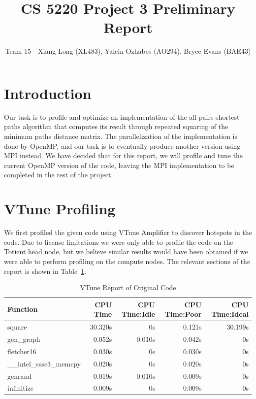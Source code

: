 \documentclass{article}
\begin{document}
\title{CS 5220 Project 3 Preliminary Report}
\author{Team 15 - Xiang Long (XL483), Yalcin Ozhabes (AO294), Bryce Evans (BAE43)}

\maketitle

\section{Introduction}

Our task is to profile and optimize an implementation of the all-pairs-shortest-paths algorithm that computes its result through repeated squaring of the minimum paths distance matrix. The parallelization of the implementation is done by OpenMP, and our task is to eventually produce another version using MPI instead. We have decided that for this report, we will profile and tune the current OpenMP version of the code, leaving the MPI implementation to be completed in the rest of the project.

\section{VTune Profiling}

We first profiled the given code using VTune Amplifier to discover hotspots in the code. Due to license limitations we were only able to profile the code on the Totient head node, but we believe similar results would have been obtained if we were able to perform profiling on the compute nodes. The relevant sections of the report is shown in Table~\ref{vtune}.

\begin{table}[h]
 \centering
  \begin{tabular}{ | l | r | r | r | r | }
 \hline
Function             & CPU Time &  CPU Time:Idle & CPU Time:Poor & CPU Time:Ideal \\ \hline
square               &  30.320s &             0s &        0.121s &        30.199s \\
gen\_graph            &   0.052s &         0.010s &        0.042s &             0s \\
fletcher16           &   0.030s &             0s &        0.030s &             0s \\
\_\_intel\_ssse3\_memcpy &   0.020s &             0s &        0.020s &             0s \\
genrand              &   0.019s &         0.010s &        0.009s &             0s \\
infinitize           &   0.009s &             0s &        0.009s &             0s \\ \hline
\end{tabular}
 \caption{VTune Report of Original Code}
 \label{vtune}
\end{table}
\end{document}
